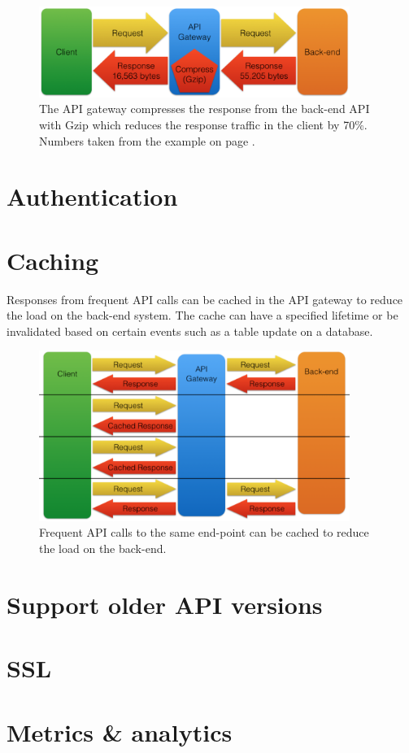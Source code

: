 \documentclass{cslthse-msc}
\begin{document}
\begin{figure}[H]
  \centering
    \begin{center}
      \includegraphics[width=0.9\textwidth]{images/api_gateway_compression.png}
    \end{center}
  \caption{The API gateway compresses the response from the back-end API with Gzip which reduces the response traffic in the client by 70\%. Numbers taken from the example on page \pageref{compression}.}
\end{figure}

\section{Authentication}

\section{Caching}
Responses from frequent API calls can be cached in the API gateway to reduce the load on the back-end system\cite[page 107]{AASG}. The cache can have a specified lifetime or be invalidated based on certain events such as a table update on a database.

\begin{figure}[H]
  \centering
    \begin{center}
      \includegraphics[width=0.9\textwidth]{images/api_gateway_cache.png}
    \end{center}
  \caption{Frequent API calls to the same end-point can be cached to reduce the load on the back-end.}
\end{figure} 


\section{Support older API versions}

\section{SSL}

\section{Metrics \& analytics}

\cleardoublepage
{}
{}



\end{document}

